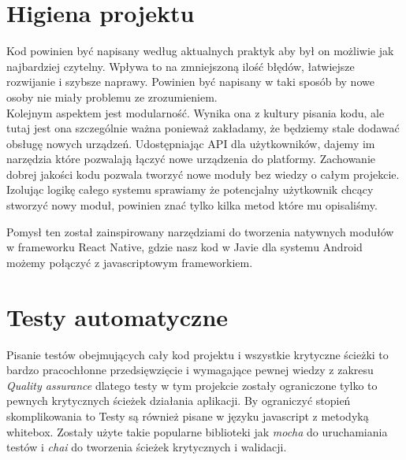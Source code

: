 \section{Higiena projektu}
Kod powinien być napisany według aktualnych praktyk aby był on możliwie jak najbardziej czytelny. Wpływa to na zmniejszoną ilość błędów, łatwiejsze rozwijanie i szybsze naprawy. Powinien być napisany w taki sposób by nowe osoby nie miały problemu ze zrozumieniem. \\
Kolejnym aspektem jest modularność. Wynika ona z kultury pisania kodu, ale tutaj jest ona szczególnie ważna ponieważ zakładamy, że będziemy stale dodawać obsługę nowych urządzeń. Udostępniając API dla użytkowników, dajemy im narzędzia które pozwalają łączyć nowe urządzenia do platformy. Zachowanie dobrej jakości kodu pozwala tworzyć nowe moduły bez wiedzy o całym projekcie. Izolując logikę całego systemu sprawiamy że potencjalny użytkownik chcący stworzyć nowy moduł, powinien znać tylko kilka metod które mu opisaliśmy. 
\par Pomysł ten został zainspirowany narzędziami do tworzenia natywnych modułów w frameworku React Native, gdzie nasz kod w Javie dla systemu Android możemy połączyć z javascriptowym frameworkiem. 
\section{Testy automatyczne}
Pisanie testów obejmujących cały kod projektu i wszystkie krytyczne ścieżki to bardzo pracochłonne przedsięwzięcie i wymagające pewnej wiedzy z zakresu \textit{Quality assurance} dlatego testy w tym projekcie zostały ograniczone tylko to pewnych krytycznych ścieżek działania aplikacji. By ograniczyć stopień skomplikowania to Testy są również pisane w języku javascript z metodyką whitebox. Zostały użyte takie popularne biblioteki jak \textit{mocha} do uruchamiania testów i \textit{chai} do tworzenia ścieżek krytycznych i walidacji. 